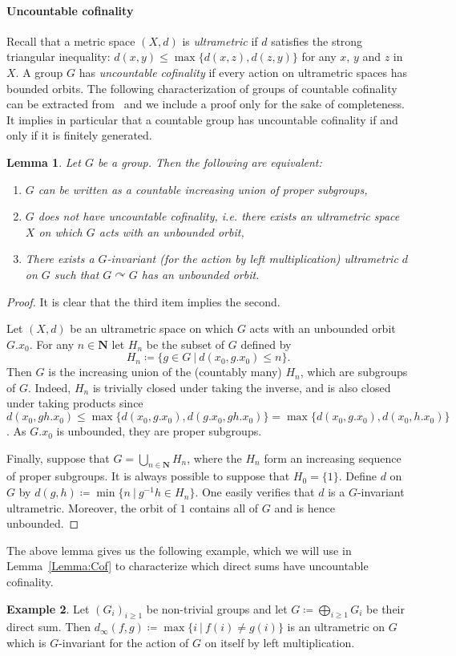 \documentclass[a4paper]{article}
\newcommand{\PH}[1]{\todo[color={blue!33},size=small]{\textbf{PH :} #1}}
\newtheorem{lem}{Lemma}[section]
\theoremstyle{definition}
\newtheorem{exmp}[lem]{Example}
\newcommand*{\field}[1]{\mathbf{#1}}
\newcommand*{\N}{\field{N}}
\newcommand{\setst}[2]{\{#1\ |\ #2\}}
\begin{document}
\paragraph{Uncountable cofinality}
Recall that a metric space $(X,d)$ is \emph{ultrametric} if $d$ satisfies the strong triangular inequality: $d(x,y)\leq\max\{d(x,z),d(z,y)\}$ for any $x$, $y$ and $z$ in $X$.
A group $G$ has \emph{uncountable cofinality} if every action on ultrametric spaces has bounded orbits.
The following characterization of groups of countable cofinality can be extracted from~\cite{MR2240370} and we include a proof only for the sake of completeness.
It implies in particular that a countable group has uncountable cofinality if and only if it is finitely generated.
%
%
\begin{lem}\label{Lemma:CofSub}
Let $G$ be a group. Then the following are equivalent:
\begin{enumerate}
\item $G$ can be written as a countable increasing union of proper subgroups,
\item $G$ does not have uncountable cofinality, i.e. there exists an ultrametric space $X$ on which $G$ acts with an unbounded orbit,
\item There exists a $G$-invariant (for the action by left multiplication) ultrametric $d$ on $G$ such that $G\curvearrowright G$ has an unbounded orbit.
\end{enumerate}
\end{lem}
\begin{proof}
It is clear that the third item implies the second.

Let $(X,d)$ be an ultrametric space on which $G$ acts with an unbounded orbit $G.x_0$. For any $n\in \N$ let $H_n$ be the subset of $G$ defined by
\[
	H_n\coloneqq\setst{g\in G}{d(x_0,g.x_0)\leq n}.
\]
Then $G$ is the increasing union of the (countably many) $H_n$, which are subgroups of $G$.
Indeed, $H_n$ is trivially closed under taking the inverse, and is also closed under taking products since $d(x_0,gh.x_0)\leq\max\{d(x_0,g.x_0),d(g.x_0,gh.x_0)\}=\max\{d(x_0,g.x_0),d(x_0,h.x_0)\}$.
As $G.x_0$ is unbounded, they are proper subgroups.

Finally, suppose that $G=\bigcup_{n\in \N}H_n$, where the $H_n$ form an increasing sequence of proper subgroups.
It is always possible to suppose that $H_0=\{1\}$.
Define $d$ on $G$ by $d(g,h)\coloneqq\min\setst{n}{g^{-1}h\in H_n}$.
One easily verifies that $d$ is a $G$-invariant ultrametric. Moreover, the orbit of $1$ contains all of $G$ and is hence unbounded.
\end{proof}
%
%
The above lemma gives us the following example, which we will use in Lemma~\ref{Lemma:Cof} to characterize which direct sums have uncountable cofinality.\PH{Ajouté la justification de l'exemple.}
%
%
\begin{exmp}\label{Exmpl:Ultra}
Let $(G_i)_{i\geq 1}$ be non-trivial groups and let $G\coloneqq\bigoplus_{i\geq 1} G_i$ be their direct sum.
Then $d_\infty(f,g)\coloneqq\max\setst{i}{f(i)\neq g(i)}$ is an ultrametric on $G$ which is $G$-invariant for the action of $G$ on itself by left multiplication.\end{exmp}
%
%
%
\end{document}
